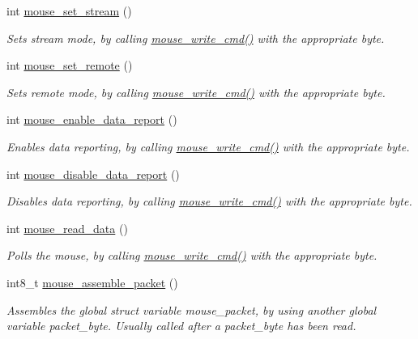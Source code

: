 \begin{DoxyCompactItemize}
int \mbox{\hyperlink{group__mouse_ga7de2d644cbc4f0c10fa7888413230863}{mouse\+\_\+set\+\_\+stream}} ()
\begin{DoxyCompactList}\small\item\em Sets stream mode, by calling \mbox{\hyperlink{group__mouse_ga14261d6dca45cb7cc9c8a786739ac5a3}{mouse\+\_\+write\+\_\+cmd()}} with the appropriate byte. \end{DoxyCompactList}\item 
int \mbox{\hyperlink{group__mouse_ga848ca3a5a4826200866774d23c80d286}{mouse\+\_\+set\+\_\+remote}} ()
\begin{DoxyCompactList}\small\item\em Sets remote mode, by calling \mbox{\hyperlink{group__mouse_ga14261d6dca45cb7cc9c8a786739ac5a3}{mouse\+\_\+write\+\_\+cmd()}} with the appropriate byte. \end{DoxyCompactList}\item 
int \mbox{\hyperlink{group__mouse_ga108813d01ba189cc8bb0dca728c932a8}{mouse\+\_\+enable\+\_\+data\+\_\+report}} ()
\begin{DoxyCompactList}\small\item\em Enables data reporting, by calling \mbox{\hyperlink{group__mouse_ga14261d6dca45cb7cc9c8a786739ac5a3}{mouse\+\_\+write\+\_\+cmd()}} with the appropriate byte. \end{DoxyCompactList}\item 
int \mbox{\hyperlink{group__mouse_gac13ad81d843b4d50815de4b20a28db53}{mouse\+\_\+disable\+\_\+data\+\_\+report}} ()
\begin{DoxyCompactList}\small\item\em Disables data reporting, by calling \mbox{\hyperlink{group__mouse_ga14261d6dca45cb7cc9c8a786739ac5a3}{mouse\+\_\+write\+\_\+cmd()}} with the appropriate byte. \end{DoxyCompactList}\item 
int \mbox{\hyperlink{group__mouse_ga0eb4568033242c6785c4e2c48a77c927}{mouse\+\_\+read\+\_\+data}} ()
\begin{DoxyCompactList}\small\item\em Polls the mouse, by calling \mbox{\hyperlink{group__mouse_ga14261d6dca45cb7cc9c8a786739ac5a3}{mouse\+\_\+write\+\_\+cmd()}} with the appropriate byte. \end{DoxyCompactList}\item 
int8\+\_\+t \mbox{\hyperlink{group__mouse_gac86505acc047efa4adb87f0fa6d4319f}{mouse\+\_\+assemble\+\_\+packet}} ()
\begin{DoxyCompactList}\small\item\em Assembles the global struct variable mouse\+\_\+packet, by using another global variable packet\+\_\+byte. Usually called after a packet\+\_\+byte has been read. \end{DoxyCompactList}\item 

\end{DoxyCompactItemize}
